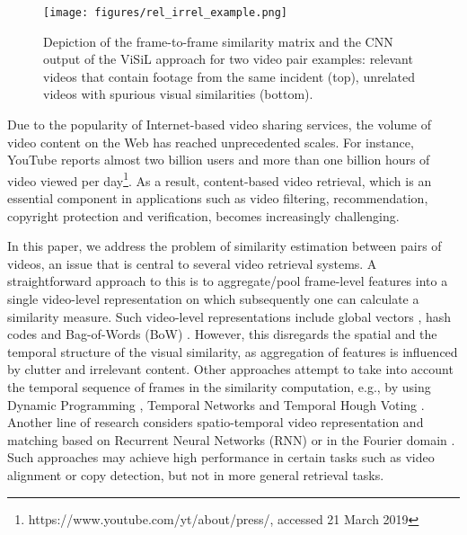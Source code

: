 \documentclass[10pt,twocolumn,letterpaper]{article}
\begin{document}
\begin{figure}[t]
\centering
\texttt{[image: figures/rel\_irrel\_example.png]}
\vspace{0.05cm}
\caption{Depiction of the frame-to-frame similarity matrix and the CNN output of the ViSiL approach for two video pair examples: relevant videos that contain footage from the same incident (top), unrelated videos with spurious visual similarities (bottom).}
\label{fig:similarity_matrix_example}
\end{figure}

Due to the popularity of Internet-based video sharing services, the volume of video content on the Web has reached unprecedented scales. For instance, YouTube reports almost two billion users and more than one billion hours of video viewed per day\footnote{https://www.youtube.com/yt/about/press/, accessed 21 March 2019}.
As a result, content-based video retrieval, which is an essential component in applications such as video filtering, recommendation, copyright protection and verification, becomes increasingly challenging.

In this paper, we address the problem of similarity estimation between pairs of videos, an issue that is central to several video retrieval systems. A straightforward approach to this is to aggregate/pool frame-level features into a single video-level representation on which subsequently one can calculate a similarity measure. Such video-level representations include global vectors \cite{wu2007, gao2017, kordopatis2017b}, hash codes \cite{song2011, liong2017, song2018} and Bag-of-Words (BoW) \cite{cai2011, kordopatis2017a, liao2018}. However, this disregards the spatial and the temporal structure of the visual similarity, as aggregation of features is influenced by clutter and irrelevant content. Other approaches attempt to take into account the temporal sequence of frames in the similarity computation, e.g., by using Dynamic Programming \cite{chou2015, liu2017}, Temporal Networks \cite{tan2009, jiang2016} and Temporal Hough Voting \cite{douze2010, jiang2014}. Another line of research considers spatio-temporal video representation and matching based on Recurrent Neural Networks (RNN) \cite{feng2018, hu2018} or in the Fourier domain \cite{revaud2013, poullot2015, baraldi2018}. Such approaches may achieve high performance in certain tasks such as video alignment or copy detection, but not in more general retrieval tasks. 
\end{document}
